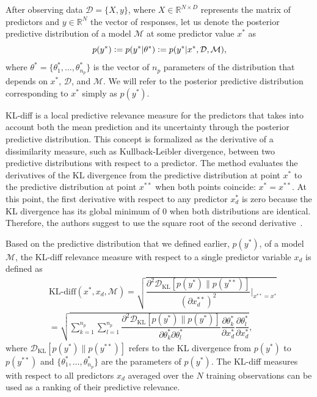 \documentclass{article}
\begin{document}
After observing data $\mathcal{D} = \{ {X}, {y} \}$, where ${X} \in \mathbb{R}^{N\times D}$ represents the matrix of predictors and ${y} \in \mathbb{R}^N$ the vector of responses, let us denote the posterior predictive distribution of a model $\mathcal{M}$ at some predictor value ${x}^*$ as
\begin{equation*}
p  (y^{*})  \vcentcolon = p  (y^{*} | {\theta}^{*}) \vcentcolon =  p  (y^{*} | {x}^{*},\mathcal{D}, \mathcal{M}) ,
%
%
%
\end{equation*}
where ${\theta}^* = \{ \theta_1^*, \ldots, \theta_{n_p}^* \}$ is the vector of $n_p$ parameters of the distribution that depends on ${x}^*$, $\mathcal{D}$, and $\mathcal{M}$.
We will refer to the posterior predictive distribution corresponding to ${x}^*$ simply as $p(y^*)$.
%

KL-diff is a local predictive relevance measure for the predictors that takes into account both the mean prediction and its uncertainty through the posterior predictive distribution. 
%
This concept is formalized as the derivative of a dissimilarity measure, such as Kullback-Leibler
divergence, between two predictive distributions with respect to a predictor.
%
%
The method evaluates the derivatives of the KL divergence from the predictive distribution at point ${x}^*$ to the predictive distribution at point ${x}^{**}$ when both points coincide: ${x}^* = {x}^{**}$.
At this point, the first derivative with respect to any predictor $x^*_d$ is zero because the KL divergence has its global minimum of $0$ when both distributions are identical.
Therefore, the authors suggest to use the square root of the second derivative~\cite{paananen2019ranking}.

Based on the predictive distribution that we defined earlier, $p(y^*)$, of a model $\mathcal{M}$, the KL-diff relevance measure with respect to a single predictor variable $x_d$ is defined as
\begin{align*}
    & \text{KL-diff}({x}^*, x_d, \mathcal{M}) = \sqrt{\dfrac{\partial^2 \mathcal{D}_{\text{KL}} [p(y^*)\| p(y^{**})]}{(\partial x^{**}_d)^2}\bigg\rvert_{{x}^{**}={x}^*}} \nonumber\\
    &  = \sqrt{\sum_{k=1}^{n_p}\sum_{l=1}^{n_p}\dfrac{\partial^2 \mathcal{D}_{\text{KL}} [p(y^{*})\| p(y^{*})]}{\partial\theta_k^*\partial\theta_l^*}\dfrac{\partial\theta_k^*}{\partial x_d^*}\dfrac{\partial\theta_l^*}{\partial x_d^*}},
\end{align*}
where $\mathcal{D}_{\text{KL}} [p(y^*) \| p(y^{**})]$ refers to the KL divergence from $p(y^*)$ to $p(y^{**})$ and $\{\theta_1^*, \ldots, \theta_{n_p}^*\}$ are the parameters of $p(y^*)$.
The KL-diff measures with respect to all predictors $x_d$ averaged over the $N$ training
observations can be used as a ranking of their predictive relevance.
%
\end{document}
